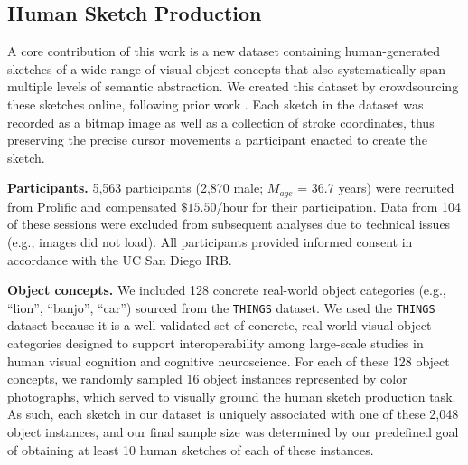 \documentclass{article}
\begin{document}
\subsection{Human Sketch Production}
\vspace{-0.5em}
A core contribution of this work is a new dataset containing human-generated sketches of a wide range of visual object concepts that also systematically span multiple levels of semantic abstraction. 
We created this dataset by crowdsourcing these sketches online, following prior work \cite{fan2018common, yu2016sketch, sangkloy2016sketchy, fan2020pragmatic, hawkins2023visual, jongejan2017quick}.
Each sketch in the dataset was recorded as a bitmap image as well as a collection of stroke coordinates, thus preserving the precise cursor movements a participant enacted to create the sketch.

\textbf{Participants.} 
5,563 participants (2,870 male; $M_{age}$ = 36.7 years) were recruited from Prolific and compensated $\$15.50$/hour for their participation.
Data from 104 of these sessions were excluded from subsequent analyses due to technical issues (e.g., images did not load). 
All participants provided informed consent in accordance with the UC San Diego IRB.

\textbf{Object concepts.} We included 128 concrete real-world object categories (e.g., ``lion'', ``banjo'', ``car'') sourced from the \texttt{THINGS} dataset. 
We used the \texttt{THINGS} dataset \cite{hebart2019things, hebart2023things} because it is a well validated set of concrete, real-world visual object categories designed to support interoperability among large-scale studies in human visual cognition and cognitive neuroscience.
For each of these 128 object concepts, we randomly sampled 16 object instances represented by color photographs, which served to visually ground the human sketch production task. 
As such, each sketch in our dataset is uniquely associated with one of these 2,048 object instances, and our final sample size was determined by our predefined goal of obtaining at least 10 human sketches of each of these instances. 
\end{document}
